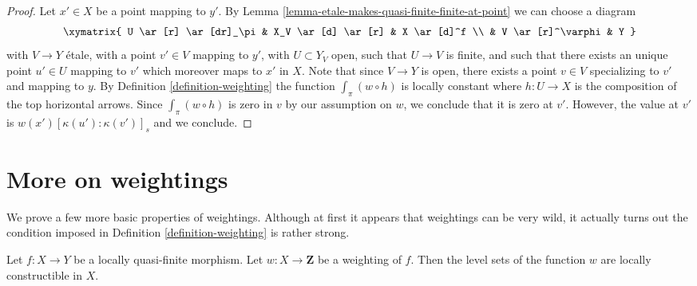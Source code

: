 \begin{proof}
Let $x' \in X$ be a point mapping to $y'$. By
Lemma \ref{lemma-etale-makes-quasi-finite-finite-at-point}
we can choose a diagram
$$
\xymatrix{
U \ar[r] \ar[dr]_\pi & X_V \ar[d] \ar[r] & X \ar[d]^f \\
& V \ar[r]^\varphi & Y
}
$$
with $V \to Y$ \'etale, with a point $v' \in V$ mapping to $y'$,
with $U \subset Y_V$ open, such that $U \to V$ is finite, and
such that there exists an unique point $u' \in U$ mapping to $v'$
which moreover maps to $x'$ in $X$. Note that since $V \to Y$ is open,
there exists a point $v \in V$ specializing to $v'$ and mapping to $y$.
By Definition \ref{definition-weighting} the function
$\int_\pi (w \circ h)$ is locally constant where $h : U \to X$ is
the composition of the top horizontal arrows.
Since $\int_\pi (w \circ h)$ is zero in $v$ by
our assumption on $w$, we conclude that it is zero
at $v'$. However, the value at $v'$ is $w(x')[\kappa(u'):\kappa(v')]_s$
and we conclude.
\end{proof}




\section{More on weightings}
\label{section-more-weightings}

\noindent
We prove a few more basic properties of weightings. Although
at first it appears that weightings can be very wild, it
actually turns out the condition imposed in
Definition \ref{definition-weighting} is rather strong.

\begin{lemma}
\label{lemma-jumps-w}
Let $f : X \to Y$ be a locally quasi-finite morphism.
Let $w : X \to \mathbf{Z}$ be a weighting of $f$. Then
the level sets of the function $w$ are locally constructible in $X$.
\end{lemma}

